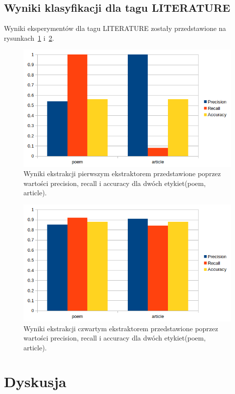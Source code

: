 \documentclass{classrep}
\begin{document}
\subsection{Wyniki klasyfikacji dla tagu LITERATURE}
Wyniki eksperymentów dla tagu LITERATURE zostały przedstawione na rysunkach~\ref{fig:LITERATURE1} i~\ref{fig:LITERATURE2}.\\
\begin{figure}[H]
  \includegraphics[width=\linewidth]{wykresy/1ext2tag_precrecacc.png}
  \caption{Wyniki ekstrakcji pierwszym ekstraktorem przedstawione poprzez wartości precision, recall i accuracy dla dwóch etykiet(poem, article).}
  \label{fig:LITERATURE1}
\end{figure}
\begin{figure}[H]
  \includegraphics[width=\linewidth]{wykresy/4ext2tag_precrecacc.png}
  \caption{Wyniki ekstrakcji czwartym ekstraktorem przedstawione poprzez wartości precision, recall i accuracy dla dwóch etykiet(poem, article).}
  \label{fig:LITERATURE2}
\end{figure}
\newpage

\section{Dyskusja}
\end{document}
